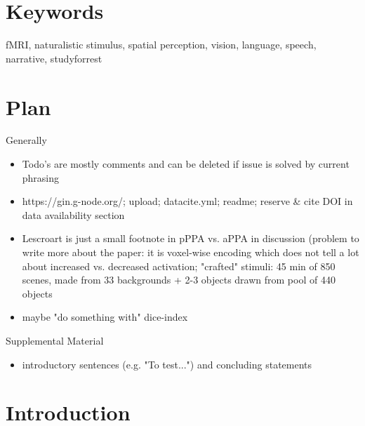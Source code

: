 \documentclass[english]{article}
\begin{document}
\section*{Keywords}
fMRI, naturalistic stimulus, spatial perception, vision, language, speech,
narrative, studyforrest

\pagebreak[4]


\section*{Plan}

\noindent Generally
\begin{itemize}
    \item Todo's are mostly comments and can be deleted if issue is solved by
        current phrasing
    \item https://gin.g-node.org/; upload; datacite.yml; readme; reserve \&
        cite DOI in data availability section
    \item Lescroart is just a small footnote in pPPA vs. aPPA in discussion
        (problem to write more about the paper: it is voxel-wise encoding which
        does not tell a lot about increased vs. decreased activation; "crafted"
        stimuli: 45 min of 850 scenes, made from 33 backgrounds + 2-3 objects
        drawn from pool of 440 objects
    \item maybe "do something with" dice-index
\end{itemize}


\noindent Supplemental Material
\begin{itemize}
    \item introductory sentences (e.g. "To test...") and concluding statements
\end{itemize}


\pagebreak[4]


\section{Introduction}

\end{document}
